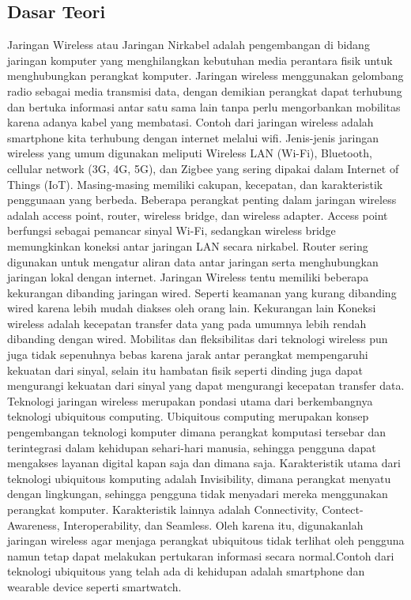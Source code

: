 \subsection{Dasar Teori}
Jaringan Wireless atau Jaringan Nirkabel adalah pengembangan di bidang jaringan komputer yang menghilangkan kebutuhan media perantara fisik untuk menghubungkan perangkat komputer. Jaringan wireless menggunakan gelombang radio sebagai media transmisi data, dengan demikian perangkat dapat terhubung dan bertuka informasi antar satu sama lain tanpa perlu mengorbankan mobilitas karena adanya kabel yang membatasi. Contoh dari jaringan wireless adalah smartphone kita terhubung dengan internet melalui wifi.
Jenis-jenis jaringan wireless yang umum digunakan meliputi Wireless LAN (Wi-Fi), Bluetooth, cellular network (3G, 4G, 5G), dan Zigbee yang sering dipakai dalam Internet of Things (IoT). Masing-masing memiliki cakupan, kecepatan, dan karakteristik penggunaan yang berbeda. Beberapa perangkat penting dalam jaringan wireless adalah access point, router, wireless bridge, dan wireless adapter. Access point berfungsi sebagai pemancar sinyal Wi-Fi, sedangkan wireless bridge memungkinkan koneksi antar jaringan LAN secara nirkabel. Router sering digunakan untuk mengatur aliran data antar jaringan serta menghubungkan jaringan lokal dengan internet.
Jaringan Wireless tentu memiliki beberapa kekurangan dibanding jaringan wired. Seperti keamanan yang kurang dibanding wired karena lebih mudah diakses oleh orang lain. Kekurangan lain Koneksi wireless adalah kecepatan transfer data yang pada umumnya lebih rendah dibanding dengan wired. Mobilitas dan fleksibilitas dari teknologi wireless pun juga tidak sepenuhnya bebas karena jarak antar perangkat mempengaruhi kekuatan dari sinyal, selain itu hambatan fisik seperti dinding juga dapat mengurangi kekuatan dari sinyal yang dapat mengurangi kecepatan transfer data.
Teknologi jaringan wireless merupakan pondasi utama dari berkembangnya teknologi ubiquitous computing. Ubiquitous computing merupakan konsep pengembangan teknologi komputer dimana perangkat komputasi tersebar dan terintegrasi dalam kehidupan sehari-hari manusia, sehingga pengguna dapat mengakses layanan digital kapan saja dan dimana saja. Karakteristik utama dari teknologi ubiquitous komputing adalah Invisibility, dimana perangkat menyatu dengan lingkungan, sehingga pengguna tidak menyadari mereka menggunakan perangkat komputer. Karakteristik lainnya adalah Connectivity, Contect-Awareness, Interoperability, dan Seamless. Oleh karena itu, digunakanlah jaringan wireless agar menjaga perangkat ubiquitous tidak terlihat oleh pengguna namun tetap dapat melakukan pertukaran informasi secara normal.Contoh dari teknologi ubiquitous yang telah ada di kehidupan adalah smartphone dan wearable device seperti smartwatch.

